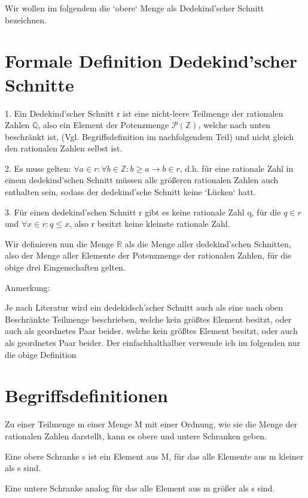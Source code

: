 \documentclass[12pt]{article}
\begin{document}
    Wir wollen im folgendem die `obere` Menge als Dedekind'scher Schnitt bezeichnen.

    \section{Formale Definition Dedekind'scher Schnitte}

    1. Ein Dedekind'scher Schnitt r ist eine nicht-leere Teilmenge der rationalen Zahlen $\mathbb{Q}$,
    also ein Element der Potenzmenge $\mathcal{P}(\mathbb{Z})$, welche nach unten beschränkt ist,
    (Vgl. Begriffsdefinition im nachfolgendem Teil) und nicht gleich den rationalen Zahlen selbst ist.

    2. Es muss gelten: $\forall a \in r: \forall b \in \mathbb{Z}: b \ge a \rightarrow b \in r$, d.h.
    für eine rationale Zahl in einem dedekind'schen Schnitt müssen alle größeren rationalen Zahlen auch enthalten sein,
    sodass der dedekind'sche Schnitt keine `Lücken` hatt.

    3. Für einen dedekind'schen Schnitt r gibt es keine rationale Zahl q, für die $q \in r$ und $\forall x \in r: q \le x$,
    also r besitzt keine kleinste rationale Zahl.

    Wir definieren nun die Menge $\mathbb{R}$ als die Menge aller dedekind'schen Schnitten, also der Menge aller
    Elemente der Potenzmenge der rationalen Zahlen, für die obige drei Eingenschaften gelten.

    Anmerkung:

    Je nach Literatur wird ein dedekidsch'scher Schnitt auch als eine nach oben Beschränkte Teilmenge beschrieben,
    welche kein größtes Element besitzt, oder auch als geordnetes Paar beider.
    welche kein größtes Element besitzt, oder auch als geordnetes Paar beider. Der einfachhalthalber
    verwende ich im folgenden nur die obige Definition

    \section{Begriffsdefinitionen}

    Zu einer Teilmenge m einer Menge M mit einer Ordnung, wie sie die Menge der rationalen Zahlen darstellt,
    kann es obere und untere Schranken geben.

    Eine obere Schranke s ist ein Element aus M, für das alle Elemente aus m kleiner als s sind.

    Eine untere Schranke analog für das alle Element aus m größer als s sind.
\end{document}
